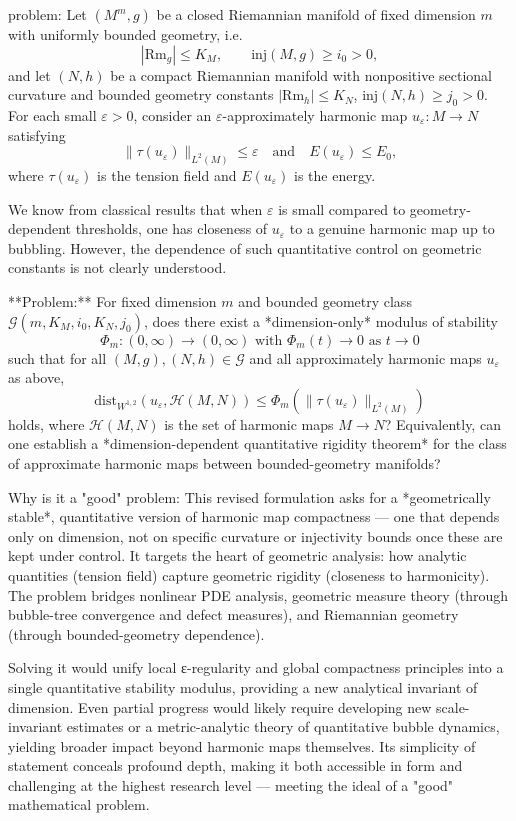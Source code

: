 problem:  
Let \( (M^m,g) \) be a closed Riemannian manifold of fixed dimension \(m\) with uniformly bounded geometry, i.e.  
\[
|\mathrm{Rm}_g| \le K_M, \qquad \mathrm{inj}(M,g) \ge i_0 > 0,
\]  
and let \( (N,h) \) be a compact Riemannian manifold with nonpositive sectional curvature and bounded geometry constants \( |\mathrm{Rm}_h| \le K_N \), \( \mathrm{inj}(N,h) \ge j_0 > 0 \).  
For each small \( \varepsilon > 0 \), consider an \( \varepsilon \)-approximately harmonic map \( u_\varepsilon : M \to N \) satisfying  
\[
\|\tau(u_\varepsilon)\|_{L^2(M)} \le \varepsilon
\quad \text{and} \quad E(u_\varepsilon) \le E_0,
\]
where \( \tau(u_\varepsilon) \) is the tension field and \(E(u_\varepsilon)\) is the energy.

We know from classical results that when \( \varepsilon \) is small compared to geometry-dependent thresholds, one has closeness of \(u_\varepsilon\) to a genuine harmonic map up to bubbling. However, the dependence of such quantitative control on geometric constants is not clearly understood.

**Problem:**  
For fixed dimension \(m\) and bounded geometry class \(\mathcal{G}(m,K_M,i_0,K_N,j_0)\), does there exist a *dimension-only* modulus of stability  
\[
\Phi_m:(0,\infty) \to (0,\infty) \text{ with } \Phi_m(t) \to 0 \text{ as } t \to 0
\]
such that for all \((M,g),(N,h)\in\mathcal{G}\) and all approximately harmonic maps \(u_\varepsilon\) as above,  
\[
\mathrm{dist}_{W^{1,2}}(u_\varepsilon,\mathcal{H}(M,N)) \le \Phi_m(\|\tau(u_\varepsilon)\|_{L^2(M)})
\]
holds, where \(\mathcal{H}(M,N)\) is the set of harmonic maps \(M \to N\)?  
Equivalently, can one establish a *dimension-dependent quantitative rigidity theorem* for the class of approximate harmonic maps between bounded-geometry manifolds?

Why is it a "good" problem:  
This revised formulation asks for a *geometrically stable*, quantitative version of harmonic map compactness — one that depends only on dimension, not on specific curvature or injectivity bounds once these are kept under control. It targets the heart of geometric analysis: how analytic quantities (tension field) capture geometric rigidity (closeness to harmonicity).  
The problem bridges nonlinear PDE analysis, geometric measure theory (through bubble-tree convergence and defect measures), and Riemannian geometry (through bounded-geometry dependence).  

Solving it would unify local ε-regularity and global compactness principles into a single quantitative stability modulus, providing a new analytical invariant of dimension. Even partial progress would likely require developing new scale-invariant estimates or a metric-analytic theory of quantitative bubble dynamics, yielding broader impact beyond harmonic maps themselves.  
Its simplicity of statement conceals profound depth, making it both accessible in form and challenging at the highest research level — meeting the ideal of a "good" mathematical problem.